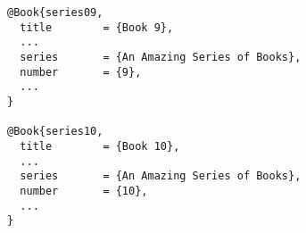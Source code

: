\documentclass{article}
\begin{document}
\begin{verbatim}
@Book{series09,
  title        = {Book 9},
  ...
  series       = {An Amazing Series of Books},
  number       = {9},
  ...
}

@Book{series10,
  title        = {Book 10},
  ...
  series       = {An Amazing Series of Books},
  number       = {10},
  ...
}
\end{verbatim}

\vfil\eject

\printbibliography
\end{document}
